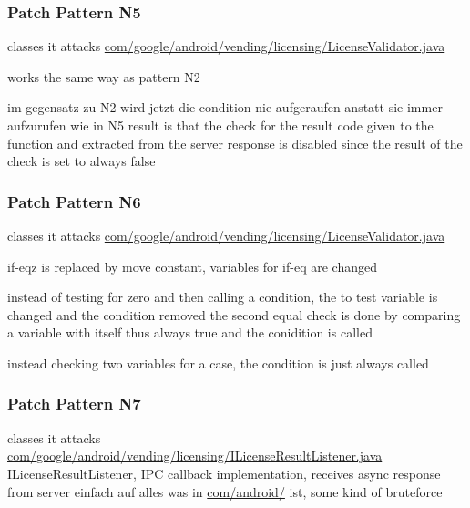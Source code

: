 \subsubsection{Patch Pattern N5}
classes it attacks %
\url{com/google/android/vending/licensing/LicenseValidator.java}

works the same way as pattern N2

im gegensatz zu N2 wird jetzt die condition nie aufgeraufen anstatt sie immer aufzurufen wie in N5
result is that the check for the result code given to the function and extracted from the server response is disabled since the result of the check is set to always false
\subsubsection{Patch Pattern N6}
classes it attacks %
\url{com/google/android/vending/licensing/LicenseValidator.java}



if-eqz is replaced by move constant, variables for if-eq are changed



instead of testing for zero and then calling a condition, the to test variable is changed and the condition removed
the second equal check is done by comparing a variable with itself thus always true and the conidition is called



instead checking two variables for a case, the condition is just always called
\subsubsection{Patch Pattern N7}
classes it attacks %
\url{com/google/android/vending/licensing/ILicenseResultListener.java}
ILicenseResultListener, IPC callback implementation, receives async response from server\cite{developersLicensingReference}
einfach auf alles was in \url{com/android/} ist, some kind of bruteforce

